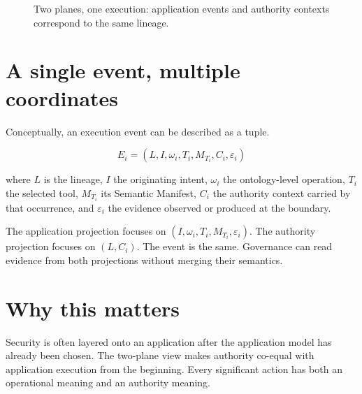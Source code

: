 \documentclass[10pt,oneside,openany]{book}
\begin{document}
\begin{figure}[ht]
\centering
{}
\caption{Two planes, one execution: application events and authority contexts correspond to the same lineage.}
\end{figure}

\section{A single event, multiple coordinates}
Conceptually, an execution event can be described as a tuple.
\begin{formulabox}
\[
E_i = (L, I, \omega_i, T_i, M_{T_i}, C_i, \varepsilon_i)
\]
\end{formulabox}
where \(L\) is the lineage, \(I\) the originating intent, \(\omega_i\) the ontology-level operation, \(T_i\) the selected tool, \(M_{T_i}\) its Semantic Manifest, \(C_i\) the authority context carried by that occurrence, and \(\varepsilon_i\) the evidence observed or produced at the boundary.

The application projection focuses on \((I,\omega_i,T_i,M_{T_i},\varepsilon_i)\). The authority projection focuses on \((L,C_i)\). The event is the same. Governance can read evidence from both projections without merging their semantics.

\section{Why this matters}
Security is often layered onto an application after the application model has already been chosen. The two-plane view makes authority co-equal with application execution from the beginning. Every significant action has both an operational meaning and an authority meaning.
\end{document}
